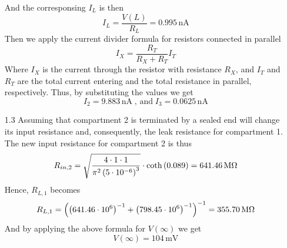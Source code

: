 \documentclass[12pt]{article}
\begin{document}
\begin{enumerate}
    And the corresponsing $I_L$ is then
    $$I_L = \frac{V(L)}{R_{L}} = 0.995 \, \text{nA}$$
    Then we apply the current divider formula for resistors connected in parallel
    $$I_{X} = \frac{R_{T}}{R_{X} + R_{T}}I_{T}$$
    Where $I_{X}$ is the current through the resistor with resistance $R_{X}$, and $I_{T}$ and $R_{T}$ are the total current entering and the total resistance in parallel, respectively.
    Thus, by substituting the values we get\\
    $$I_{2} = 9.883 \, \text{nA} \; \text{, and} \; I_{3} = 0.0625 \, \text{nA}$$
    \item[1.3] Assuming that compartment 2 is terminated by a sealed end will change its input resistance and, consequently, the leak resistance for compartment 1. The new input resistance for compartment 2 is thus
    $$R_{in,2} = \sqrt{\frac{4\cdot 1\cdot 1}{\pi^{2}\left(5\cdot 10^{-6}\right)^{3}}}\cdot \text{coth}\left(0.089\right) = 641.46 \, \text{M\si{\ohm}}$$
    Hence, $R_{L, 1}$ becomes
    $$R_{L,1} = \left(\left(641.46\cdot 10^{6}\right)^{-1} + \left(798.45\cdot 10^{6}\right)^{-1}\right)^{-1} = 355.70 \, \text{M\si{\ohm}}$$
    And by applying the above formula for $V(\infty)$ we get 
    $$V(\infty) = 104 \, \text{mV}$$
\end{enumerate}
\end{document}
